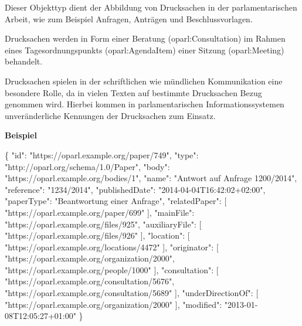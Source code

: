 \documentclass[,a4paper]{article}
\newenvironment{Shaded}{}{}
\newcommand{\DataTypeTok}[1]{\textcolor[rgb]{0.56,0.13,0.00}{{#1}}}
\newcommand{\StringTok}[1]{\textcolor[rgb]{0.25,0.44,0.63}{{#1}}}
\newcommand{\OtherTok}[1]{\textcolor[rgb]{0.00,0.44,0.13}{{#1}}}
\newcommand{\FunctionTok}[1]{\textcolor[rgb]{0.02,0.16,0.49}{{#1}}}
\begin{document}

Dieser Objekttyp dient der Abbildung von Drucksachen in der
parlamentarischen Arbeit, wie zum Beispiel Anfragen, Anträgen und
Beschlussvorlagen.

Drucksachen werden in Form einer Beratung (oparl:Consultation) im Rahmen
eines Tagesordnungspunkts (oparl:AgendaItem) einer Sitzung
(oparl:Meeting) behandelt.

Drucksachen spielen in der schriftlichen wie mündlichen Kommunikation
eine besondere Rolle, da in vielen Texten auf bestimmte Drucksachen
Bezug genommen wird. Hierbei kommen in parlamentarischen
Informationssystemen unveränderliche Kennungen der Drucksachen zum
Einsatz.

\textbf{Beispiel}

\begin{Shaded}
\begin{Highlighting}[]
\FunctionTok{\{}
    \DataTypeTok{"id"}\FunctionTok{:} \StringTok{"https://oparl.example.org/paper/749"}\FunctionTok{,}
    \DataTypeTok{"type"}\FunctionTok{:} \StringTok{"http://oparl.org/schema/1.0/Paper"}\FunctionTok{,}
    \DataTypeTok{"body"}\FunctionTok{:} \StringTok{"https://oparl.example.org/bodies/1"}\FunctionTok{,}
    \DataTypeTok{"name"}\FunctionTok{:} \StringTok{"Antwort auf Anfrage 1200/2014"}\FunctionTok{,}
    \DataTypeTok{"reference"}\FunctionTok{:} \StringTok{"1234/2014"}\FunctionTok{,}
    \DataTypeTok{"publishedDate"}\FunctionTok{:} \StringTok{"2014-04-04T16:42:02+02:00"}\FunctionTok{,}
    \DataTypeTok{"paperType"}\FunctionTok{:} \StringTok{"Beantwortung einer Anfrage"}\FunctionTok{,}
    \DataTypeTok{"relatedPaper"}\FunctionTok{:} \OtherTok{[}
        \StringTok{"https://oparl.example.org/paper/699"}
    \OtherTok{]}\FunctionTok{,}
    \DataTypeTok{"mainFile"}\FunctionTok{:} \StringTok{"https://oparl.example.org/files/925"}\FunctionTok{,}
    \DataTypeTok{"auxiliaryFile"}\FunctionTok{:} \OtherTok{[}
        \StringTok{"https://oparl.example.org/files/926"}
    \OtherTok{]}\FunctionTok{,}
    \DataTypeTok{"location"}\FunctionTok{:} \OtherTok{[}
        \StringTok{"https://oparl.example.org/locations/4472"}
    \OtherTok{]}\FunctionTok{,}
    \DataTypeTok{"originator"}\FunctionTok{:} \OtherTok{[}
        \StringTok{"https://oparl.example.org/organization/2000"}\OtherTok{,}
        \StringTok{"https://oparl.example.org/people/1000"}
    \OtherTok{]}\FunctionTok{,}
    \DataTypeTok{"consultation"}\FunctionTok{:} \OtherTok{[}
        \StringTok{"https://oparl.example.org/consultation/5676"}\OtherTok{,}
        \StringTok{"https://oparl.example.org/consultation/5689"}
    \OtherTok{]}\FunctionTok{,}
    \DataTypeTok{"underDirectionOf"}\FunctionTok{:} \OtherTok{[}
        \StringTok{"https://oparl.example.org/organization/2000"}
    \OtherTok{]}\FunctionTok{,}
    \DataTypeTok{"modified"}\FunctionTok{:} \StringTok{"2013-01-08T12:05:27+01:00"}
\FunctionTok{\}}
\end{Highlighting}
\end{Shaded}
\end{document}
